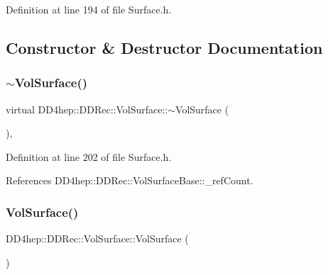 Definition at line 194 of file Surface.\+h.



\subsection{Constructor \& Destructor Documentation}
\hypertarget{class_d_d4hep_1_1_d_d_rec_1_1_vol_surface_a2e875aa0d3e673d9c07f6047f3e7d0cb}{}\label{class_d_d4hep_1_1_d_d_rec_1_1_vol_surface_a2e875aa0d3e673d9c07f6047f3e7d0cb} 
\subsubsection{\texorpdfstring{$\sim$\+Vol\+Surface()}{~VolSurface()}}
{\footnotesize\ttfamily virtual D\+D4hep\+::\+D\+D\+Rec\+::\+Vol\+Surface\+::$\sim$\+Vol\+Surface (\begin{DoxyParamCaption}{ }\end{DoxyParamCaption})\hspace{0.3cm}{\ttfamily [inline]}, {\ttfamily [virtual]}}



Definition at line 202 of file Surface.\+h.



References D\+D4hep\+::\+D\+D\+Rec\+::\+Vol\+Surface\+Base\+::\+\_\+ref\+Count.

\hypertarget{class_d_d4hep_1_1_d_d_rec_1_1_vol_surface_a4f1411058c69312c7107b4c5d5e5fc28}{}\label{class_d_d4hep_1_1_d_d_rec_1_1_vol_surface_a4f1411058c69312c7107b4c5d5e5fc28} 
\subsubsection{\texorpdfstring{Vol\+Surface()}{VolSurface()}\hspace{0.1cm}{\footnotesize\ttfamily [1/3]}}
{\footnotesize\ttfamily D\+D4hep\+::\+D\+D\+Rec\+::\+Vol\+Surface\+::\+Vol\+Surface (\begin{DoxyParamCaption}{ }\end{DoxyParamCaption})\hspace{0.3cm}{\ttfamily [inline]}}




